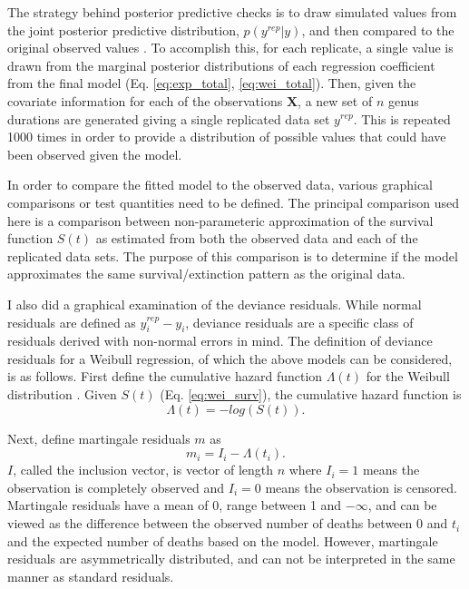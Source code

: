 \documentclass[12pt,letterpaper]{article}
\begin{document}
The strategy behind posterior predictive checks is to draw simulated values from the joint posterior predictive distribution, \(p(y^{rep} | y)\), and then compared to the original observed values \citep{Gelman2013d}. To accomplish this, for each replicate, a single value is drawn from the marginal posterior distributions of each regression coefficient from the final model (Eq. \ref{eq:exp_total}, \ref{eq:wei_total}). Then, given the covariate information for each of the observations \(\mathbf{X}\), a new set of \(n\) genus durations are generated giving a single replicated data set \(y^{rep}\). This is repeated 1000 times in order to provide a distribution of possible values that could have been observed given the model. 

In order to compare the fitted model to the observed data, various graphical comparisons or test quantities need to be defined. The principal comparison used here is a comparison between non-parameteric approximation of the survival function \(S(t)\) as estimated from both the observed data and each of the replicated data sets. The purpose of this comparison is to determine if the model approximates the same survival/extinction pattern as the original data. 

I also did a graphical examination of the deviance residuals. While normal residuals are defined as \(y_{i}^{rep} - y_{i}\), deviance residuals are a specific class of residuals derived with non-normal errors in mind. The definition of deviance residuals for a Weibull regression, of which the above models can be considered, is as follows. First define the cumulative hazard function \(\Lambda(t)\) for the Weibull distribution \citep{Klein2003}. Given \(S(t)\) (Eq. \ref{eq:wei_surv}), the cumulative hazard function is 
\begin{equation}
  \Lambda(t) = -log\left(S\left(t\right)\right).
\end{equation}

Next, define martingale residuals \(m\) as
\begin{equation}
  m_{i} = I_{i} - \Lambda(t_i).
\end{equation}
\(I\), called the inclusion vector, is vector of length \(n\) where \(I_{i} = 1\) means the observation is completely observed and \(I_{i} = 0\) means the observation is censored. Martingale residuals have a mean of 0, range between 1 and \(-\infty\), and can be viewed as the difference between the observed number of deaths between 0 and \(t_{i}\) and the expected number of deaths based on the model. However, martingale residuals are asymmetrically distributed, and can not be interpreted in the same manner as standard residuals. 
\end{document}
